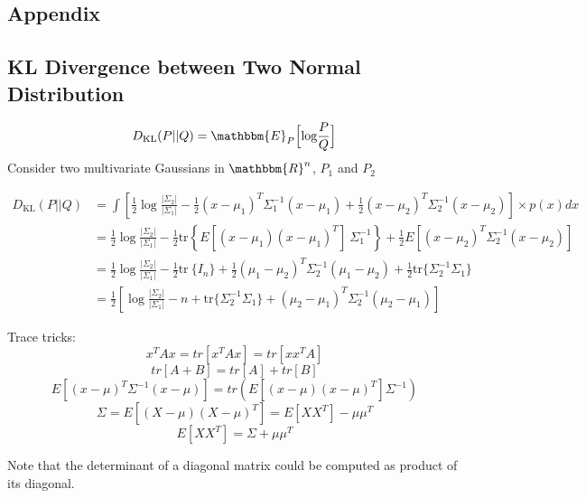 \renewcommand{\thesection}{\Alph{section}.\arabic{section}}
\setcounter{section}{0}

\begin{appendices}
\chapter{Appendix}

\section{KL Divergence between Two Normal Distribution}
\begin{align*}
D_\text{KL}(P||Q) & = \mathbbm{E}_P\Big[\textrm{log}\frac{P}{Q}\Big]\\
\end{align*}
Consider two multivariate Gaussians in $\mathbbm{R}^n$, $P_1$ and $P_2$

\begin{align*}
D_\text{KL}(P||Q) &= \int \left[ \frac{1}{2} \log\frac{|\Sigma_2|}{|\Sigma_1|} - \frac{1}{2} (x-\mu_1)^T\Sigma_1^{-1}(x-\mu_1) + \frac{1}{2} (x-\mu_2)^T\Sigma_2^{-1}(x-\mu_2) \right] \times p(x) dx \\
&= \frac{1}{2} \log\frac{|\Sigma_2|}{|\Sigma_1|} - \frac{1}{2} \text{tr} \left\{E[(x - \mu_1)(x - \mu_1)^T] \ \Sigma_1^{-1} \right\} + \frac{1}{2} E[(x - \mu_2)^T \Sigma_2^{-1} (x - \mu_2)] \\
&= \frac{1}{2} \log\frac{|\Sigma_2|}{|\Sigma_1|} - \frac{1}{2} \text{tr}\ \{I_n \} + \frac{1}{2} (\mu_1 - \mu_2)^T \Sigma_2^{-1} (\mu_1 - \mu_2) + \frac{1}{2} \text{tr} \{ \Sigma_2^{-1} \Sigma_1 \} \\
&= \frac{1}{2}\left[\log\frac{|\Sigma_2|}{|\Sigma_1|} - n + \text{tr} \{ \Sigma_2^{-1}\Sigma_1 \} + (\mu_2 - \mu_1)^T \Sigma_2^{-1}(\mu_2 - \mu_1)\right]
\end{align*}

Trace tricks:
$$x^TAx = tr[x^TAx] = tr[xx^TA]$$
$$tr[A+B] = tr[A]+tr[B]$$
$$E[(x-\mu)^T \Sigma^{-1} (x-\mu)]= tr(E[(x-\mu)(x-\mu)^T] \Sigma^{-1})$$
$$\Sigma = E[(X-\mu)(X-\mu)^T]=E[XX^T]-\mu\mu^T$$
$$E[XX^T] = \Sigma + \mu\mu^T$$

Note that the determinant of a diagonal matrix could be computed as product of its diagonal.

\end{appendices}
